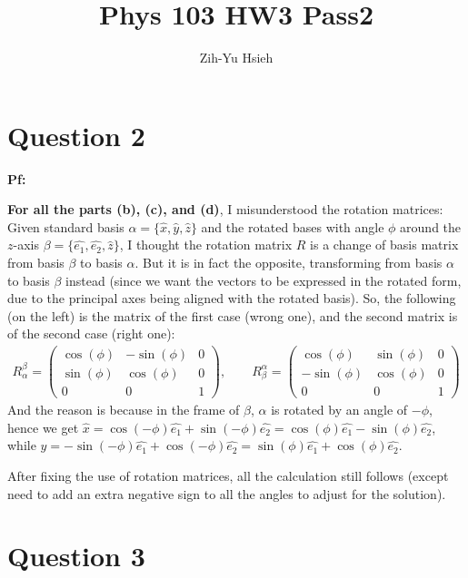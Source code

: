 \documentclass{article}
\title{Phys 103 HW3 Pass2}
\author{Zih-Yu Hsieh}
\begin{document}
\maketitle

\section*{Question 2}

\textbf{Pf:}

\textbf{For all the parts (b), (c), and (d)}, I misunderstood the rotation matrices: Given standard basis $\alpha=\{\hat{x},\hat{y},\hat{z}\}$ and the rotated bases with angle $\phi$ around the $z$-axis $\beta=\{\hat{e_1},\hat{e_2},\hat{z}\}$, I thought the rotation matrix $R$ is a change of basis matrix from basis $\beta$ to basis $\alpha$. But it is in fact the opposite, transforming from basis $\alpha$ to basis $\beta$ instead (since we want the vectors to be expressed in the rotated form, due to the principal axes being aligned with the rotated basis). So, the following (on the left) is the matrix of the first case (wrong one), and the second matrix is of the second case (right one):
\begin{align}
    R_\alpha^\beta=\begin{pmatrix}
        \cos(\phi) & -\sin(\phi) & 0\\
        \sin(\phi) & \cos(\phi) & 0\\
        0&0&1
    \end{pmatrix},\quad \quad R_\beta^\alpha = \begin{pmatrix}
        \cos(\phi) & \sin(\phi) & 0\\
        -\sin(\phi) & \cos(\phi) & 0\\
        0&0&1
    \end{pmatrix}
\end{align}
And the reason is because in the frame of $\beta$, $\alpha$ is rotated by an angle of $-\phi$, hence we get $\hat{x}=\cos(-\phi)\hat{e_1}+\sin(-\phi)\hat{e_2}=\cos(\phi)\hat{e_1}-\sin(\phi)\hat{e_2}$, while $\hat{y}=-\sin(-\phi)\hat{e_1}+\cos(-\phi)\hat{e_2} = \sin(\phi)\hat{e_1}+\cos(\phi)\hat{e_2}$.

After fixing the use of rotation matrices, all the calculation still follows (except need to add an extra negative sign to all the angles to adjust for the solution).

\hfil

\hfil

\section*{Question 3}
\end{document}
